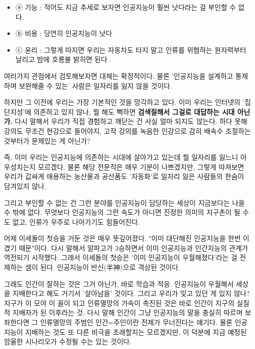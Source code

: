 \begin{itemize}
    \item[] ⓐ 기능 : 적어도 지금 추세로 보자면 인공지능이 훨씬 낫다라는 걸 부인할 수 없다.
    \item[] ⓑ 비용 : 당연히 인공지능이 낫다
    \item[] ⓒ 윤리 : 그렇게 따지면 우리는 자동차도 타지 말고 인류를 위협하는 원자력부터 날리고 밤에 호롱불 밝히면 된다 .
\end{itemize}
\vspace{5mm}

여러가지 관점에서 검토해보자면 대체는 확정적이다. 물론 '인공지능을 설계하고 통제하며 보완해줄 수 있는' 사람은 일자리를 잃지 않을 것이다.
\vspace{5mm}

하지만 그 이전에 우리는 가장 기본적인 것을 망각하고 있다.
이미 우리는 인터넷의 '집단지성'에 의존하고 있지 않나, 뭘 해도 뻑하면 \textbf{검색질해서 그걸로 대답하는 시대 아닌가.}
다시 말해서 우리가 직접 경험하고 깨닫는 건 사실 얼마 되지도 않는다.
하다 못해 강의도 무조건 현강으로 들어야지, 고작 강의를 녹음한 인강으로 감히 배속수 조절하는 것부터가 문제있는 게 아닌가?
\vspace{5mm}

즉, 이미 우리는 인공지능에 의존하는 시대에 살아가고 있는데 뭘 일자리를 잃느니 아우성치는지 모르겠다.
물론 해당 전문직은 매우 기분이 나쁘겠지만, 그렇게 따져보면 우리가 값싸게 애용하는 농산물과 공산품도
'자동화'로 일자리 잃은 사람들의 한숨이 담겨있지 않나.
\vspace{5mm}

그리고 부인할 수 없는 건 그런 분야를 인공지능이 담당하는 세상이 지금보다는 나을 수 밖에 없다.
무엇보다 인공지능의 그런 속도가 아니면 진정한 의미의 지구촌이 될 수도 없고, 인류가 우주로 나아가기도 힘들어진다.
\vspace{5mm}

어제 이세돌이 첫승을 거둔 것은 매우 뜻깊어졌다. "이미 대단해진 인공지능을 한번 이겼기 때문"이다.
다시 말해서 알파고가 3승하면서 이미 인공지능과 인간지능의 관계가 역전되기 시작했다.
그래서 이세돌의 첫승은 '이미 인공지능이 우월해졌다'라는 걸 전제하는 셈이 된다. 인공지능이 반신(半神)으로 격상된 것이다.
\vspace{5mm}

그래도 인간이 잘하는 것은 그거 아닌가, 바로 학습과 적응.
인공지능이 우월해서 세상을 지배한다고 해도 거기서 '살아남을' 것이다.
그리고 우리가 잊고 있던 게 있지 않나? 지구가 이 모야 이 꼴이 되고 인류멸망의 가속이 촉진된 것은
바로 인간이 지구의 실질적 지배자가 된 이후라는 것.
다시 말해 인간이 그냥 인공지능의 말을 충실히 따르며 보좌한다면 그 인류멸망의 주범인 인간=주인이란 전제가 무너진다는 얘기다.
물론 인공지능이 지배하는 것도 또 다른 비극을 초래할지는 모르겠지만, 이 덕분에 지금 예정된 암울한 시나리오가 수정될 수는 있는 것이다.
\vspace{5mm}




